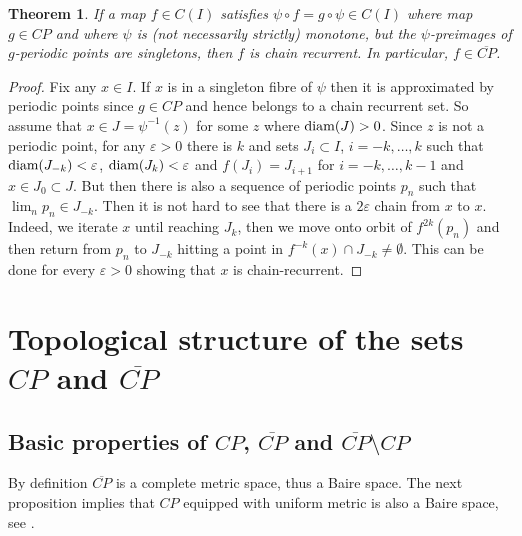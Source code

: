 \documentclass[12pt, a4paper]{amsart}
\newtheorem{theorem}{Theorem}[section]
\def\eps{\varepsilon}
\def\diam{\mbox{\rm diam} }
\newcommand{\?}{{\bf ???}}
\def\CP{\overline{CP}}
\begin{document}
 \begin{theorem}\label{thm:semi-conj}
If a map $f\in C(I)$ satisfies $\psi \circ f= g\circ \psi  \in C(I)$ where  map $g\in CP$ and where $\psi$ is (not necessarily strictly) monotone, but the $\psi$-preimages of $g$-periodic points  are singletons, then $f$ is chain recurrent. In particular, $f\in \CP$.
\end{theorem}
\begin{proof}
Fix any $x\in I$. If $x$ is in a singleton fibre of $\psi$ then it is approximated by periodic points since $g\in CP$ and hence belongs to a chain recurrent set. So assume that $x\in J=\psi^{-1}(z)$ for some $z$ where $\diam (J)>0$. Since $z$ is not a periodic point, for any $\eps>0$ there is $k$ and sets $J_i\subset I$, $i=-k,\ldots,k$ such that $\diam(J_{-k})<\eps$, $\diam(J_{k})<\eps$ and $f(J_i)=J_{i+1}$ for $i=-k,\ldots, k-1$ and $x\in J_0\subset J$. But then there is also a sequence of periodic points $p_n$ such that $\lim_{n}p_n\in J_{-k}$. Then it is not hard to see that there is a $2\eps$ chain from $x$ to $x$. Indeed, we iterate $x$ until reaching $J_{k}$, then we move onto orbit of $f^{2k}(p_n)$ and then return from $p_n$ to $J_{-k}$ hitting a point in $f^{-k}(x)\cap J_{-k}\neq \emptyset$. This can be done for every $\eps>0$ showing that $x$ is chain-recurrent.
\end{proof}

\section{Topological structure of the sets $CP$ and $\CP$}\label{sec:structure}

\subsection{Basic properties of $CP$, $\CP$ and $\CP\setminus CP$}\label{subsec:basicproperties}

 By definition $\CP$ is a complete metric space, thus a Baire space.
 The next proposition implies that $CP$ equipped with uniform metric is also a Baire space, see \cite[p. 10]{HM}.
\end{document}
